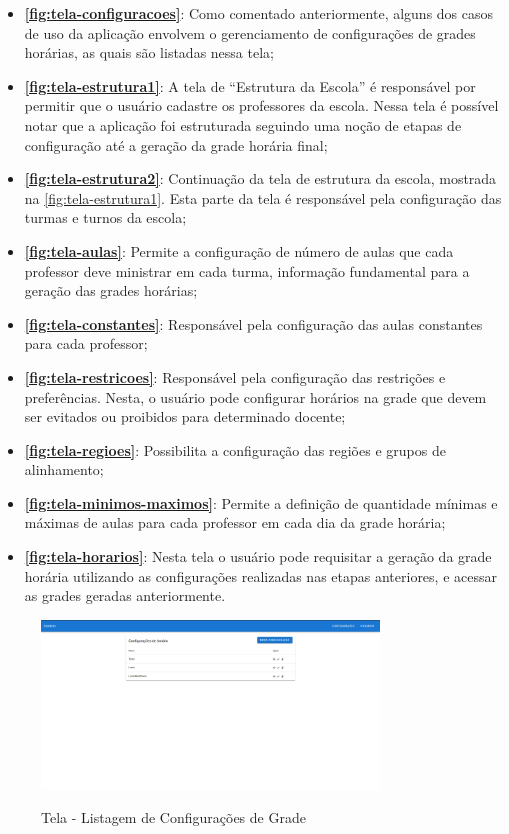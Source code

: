 \begin{itemize}
	\item \textbf{\autoref{fig:tela-configuracoes}}: Como comentado anteriormente, alguns dos casos de uso da aplicação envolvem o gerenciamento de configurações de grades horárias, as quais são listadas nessa tela;
	\item \textbf{\autoref{fig:tela-estrutura1}}: A tela de ``Estrutura da Escola'' é responsável por permitir que o usuário cadastre os professores da escola. Nessa tela é possível notar que a aplicação foi estruturada seguindo uma noção de etapas de configuração até a geração da grade horária final;
	\item \textbf{\autoref{fig:tela-estrutura2}}: Continuação da tela de estrutura da escola, mostrada na \autoref{fig:tela-estrutura1}. Esta parte da tela é responsável pela configuração das turmas e turnos da escola;
	\item \textbf{\autoref{fig:tela-aulas}}: Permite a configuração de número de aulas que cada professor deve ministrar em cada turma, informação fundamental para a geração das grades horárias;
	\item \textbf{\autoref{fig:tela-constantes}}: Responsável pela configuração das aulas constantes para cada professor;
	\item \textbf{\autoref{fig:tela-restricoes}}: Responsável pela configuração das restrições e preferências. Nesta, o usuário pode configurar horários na grade que devem ser evitados ou proibidos para determinado docente;
	\item \textbf{\autoref{fig:tela-regioes}}: Possibilita a configuração das regiões e grupos de alinhamento;
	\item \textbf{\autoref{fig:tela-minimos-maximos}}: Permite a definição de quantidade mínimas e máximas de aulas para cada professor em cada dia da grade horária;
	\item \textbf{\autoref{fig:tela-horarios}}: Nesta tela o usuário pode requisitar a geração da grade horária utilizando as configurações realizadas nas etapas anteriores, e acessar as grades geradas anteriormente.
\end{itemize}

\begin{figure}[h]
	\centering
	\caption{Tela - Listagem de Configurações de Grade}
	\includegraphics[width=0.8\textwidth]{./dados/figuras/tela_configuracoes}
	\label{fig:tela-configuracoes}
\end{figure}

